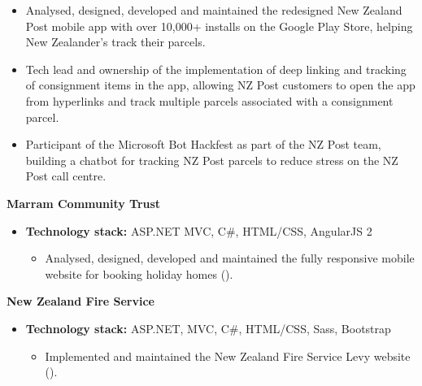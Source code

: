 \documentclass[11.5pt,a4paper,sans]{moderncv}        %
\begin{document}
    \begin{itemize}
        \item Analysed, designed, developed and maintained the redesigned New Zealand Post mobile app with over 10,000+ installs on the Google Play Store, helping New Zealander's track their parcels.
        \item Tech lead and ownership of the implementation of deep linking and tracking of consignment items in the app, allowing NZ Post customers to open the app from hyperlinks and track multiple parcels associated with a consignment parcel.
        \item Participant of the Microsoft Bot Hackfest as part of the NZ Post team, building a chatbot for tracking NZ Post parcels to reduce stress on the NZ Post call centre. 
    \end{itemize}
    
    \hfill \break
    \textbf{Marram Community Trust}
    \begin{itemize}
        \item \textbf{Technology stack:} ASP.NET MVC, C\#, HTML/CSS, AngularJS 2
        \begin{itemize}
            \item  Analysed, designed, developed and maintained the fully responsive mobile website for booking holiday homes ().
        \end{itemize}
    \end{itemize}
    \hfill \break
    \textbf{New Zealand Fire Service}
    \begin{itemize}
        \item \textbf{Technology stack:} ASP.NET, MVC, C\#, HTML/CSS, Sass, Bootstrap
        \begin{itemize}
            \item Implemented and maintained the New Zealand Fire Service Levy website ().
        \end{itemize}
    \end{itemize}

\end{document}
